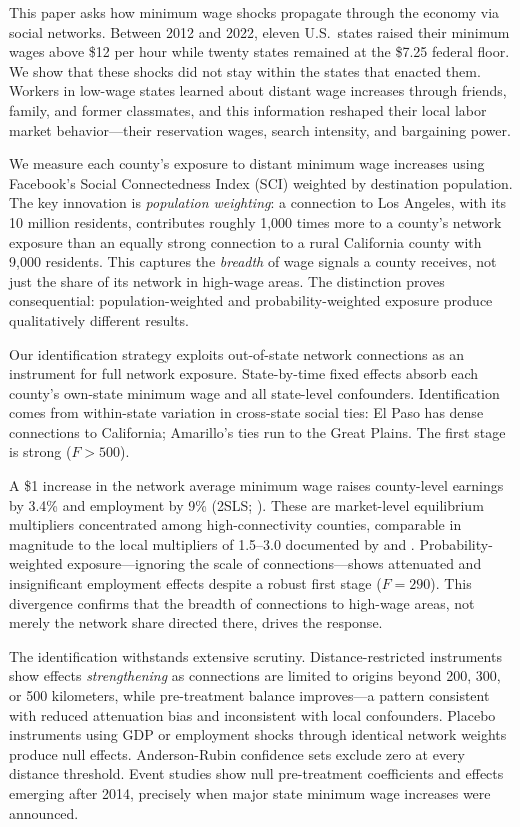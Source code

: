 \documentclass[12pt]{article}
\begin{document}
This paper asks how minimum wage shocks propagate through the economy via social networks. Between 2012 and 2022, eleven U.S.\ states raised their minimum wages above \$12 per hour while twenty states remained at the \$7.25 federal floor. We show that these shocks did not stay within the states that enacted them. Workers in low-wage states learned about distant wage increases through friends, family, and former classmates, and this information reshaped their local labor market behavior---their reservation wages, search intensity, and bargaining power.

We measure each county's exposure to distant minimum wage increases using Facebook's Social Connectedness Index (SCI) weighted by destination population. The key innovation is \textit{population weighting}: a connection to Los Angeles, with its 10 million residents, contributes roughly 1,000 times more to a county's network exposure than an equally strong connection to a rural California county with 9,000 residents. This captures the \textit{breadth} of wage signals a county receives, not just the share of its network in high-wage areas. The distinction proves consequential: population-weighted and probability-weighted exposure produce qualitatively different results.

Our identification strategy exploits out-of-state network connections as an instrument for full network exposure. State-by-time fixed effects absorb each county's own-state minimum wage and all state-level confounders. Identification comes from within-state variation in cross-state social ties: El Paso has dense connections to California; Amarillo's ties run to the Great Plains. The first stage is strong ($F > 500$).

A \$1 increase in the network average minimum wage raises county-level earnings by 3.4\% and employment by 9\% (2SLS; ). These are market-level equilibrium multipliers concentrated among high-connectivity counties, comparable in magnitude to the local multipliers of 1.5--3.0 documented by \citet{moretti2011local} and \citet{klinemoretti2014}. Probability-weighted exposure---ignoring the scale of connections---shows attenuated and insignificant employment effects despite a robust first stage ($F = 290$). This divergence confirms that the breadth of connections to high-wage areas, not merely the network share directed there, drives the response.

The identification withstands extensive scrutiny. Distance-restricted instruments show effects \textit{strengthening} as connections are limited to origins beyond 200, 300, or 500 kilometers, while pre-treatment balance improves---a pattern consistent with reduced attenuation bias and inconsistent with local confounders. Placebo instruments using GDP or employment shocks through identical network weights produce null effects. Anderson-Rubin confidence sets exclude zero at every distance threshold. Event studies show null pre-treatment coefficients and effects emerging after 2014, precisely when major state minimum wage increases were announced.
\end{document}
